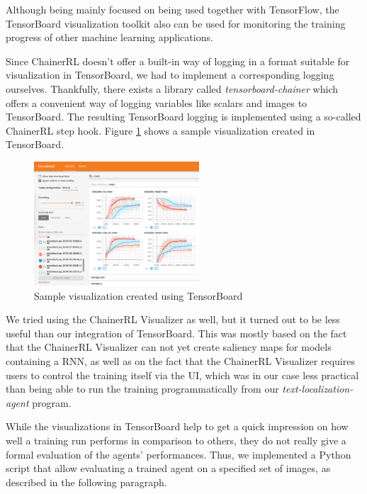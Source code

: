 Although being mainly focused on being used together with TensorFlow, the TensorBoard visualization toolkit\cite{TensorBoard} also can be used for monitoring the training progress of other machine learning applications.

Since ChainerRL doesn't offer a built-in way of logging in a format suitable for visualization in TensorBoard, we had to implement a corresponding logging ourselves.
Thankfully, there exists a library called \textit{tensorboard-chainer}\cite{TensorBoardChainer} which offers a convenient way of logging variables like scalars and images to TensorBoard.
The resulting TensorBoard logging is implemented using a so-called ChainerRL step hook\cite{ChainerRLStepHooks}.
Figure \ref{fig:tensorboard-sample-output} shows a sample visualization created in TensorBoard.

\begin{figure}[h!]
    \centering
    \includegraphics[width=0.55\textwidth]{figures/tensorboard-sample-output.png}
    \caption{Sample visualization created using TensorBoard}
    \label{fig:tensorboard-sample-output}
\end{figure}

\noindent We tried using the ChainerRL Visualizer\cite{ChainerRLVisualizer} as well, but it turned out to be less useful than our integration of TensorBoard.
This was mostly based on the fact that the ChainerRL Visualizer can not yet create saliency maps for models containing a RNN, as well as on the fact that the ChainerRL Visualizer requires users to control the training itself via the UI, which was in our case less practical than being able to run the training programmatically from our \textit{text-localization-agent} program.

While the visualizations in TensorBoard help to get a quick impression on how well a training run performs in comparison to others, they do not really give a formal evaluation of the agents' performances.
Thus, we implemented a Python script that allow evaluating a trained agent on a specified set of images, as described in the following paragraph.


